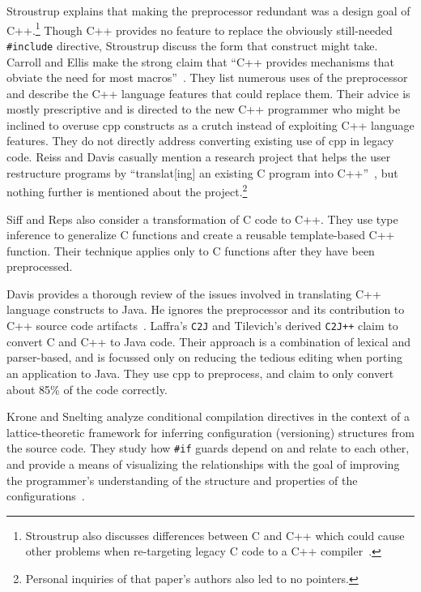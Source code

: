 \documentclass{article}
\newcommand{\Cpp}{\mbox{\textsf{cpp}}}
\newcommand{\CPP}{\mbox{\textsf{C++}}}
\newcommand{\C}{\mbox{\textsf{C}}}
\newcommand{\ppd}[1]{\texttt{\##1}}
\begin{document}
Stroustrup explains that making the preprocessor redundant was a design
goal of \CPP{}.\footnote{Stroustrup also discusses differences between
  \C{} and \CPP{} which could cause other problems when re-targeting
  legacy \C{} code to a \CPP{}
  compiler~\cite[p.~816-820]{Stroustrup97}.} Though \CPP{} provides no
feature to replace the obviously still-needed \ppd{include} directive,
Stroustrup discuss the form that construct
might take.   Carroll and Ellis make the strong claim that ``C++ provides
mechanisms that obviate the need for most
macros''~\cite[p.~147]{Carroll95}.  They list numerous uses of the
preprocessor and describe the \CPP{} language features that could
replace them.  Their advice is mostly prescriptive and is directed to
the new \CPP{} programmer who might be inclined to overuse \Cpp{}
constructs as a crutch instead of exploiting \CPP{} language features.
They do not directly address converting existing use of \Cpp{} in legacy
code.  Reiss and Davis casually mention a research project that helps
the user restructure programs by ``translat[ing] an existing \C{}
program into \CPP{}''~\cite[p.~2]{Reiss90}, but nothing further is
mentioned about the project.\footnote{Personal inquiries of that paper's
  authors also led to no pointers.}

Siff and Reps also consider a transformation of \C{} code to \CPP{}.
They use type inference to generalize \C{} functions and create a
reusable template-based \CPP{} function.  Their technique applies only
to  \C{} functions after they have been preprocessed.

Davis provides a thorough review of the issues involved in translating
\CPP{} language constructs to Java.  He ignores the preprocessor and its
contribution to \CPP{} source code artifacts~\cite{Davis97}.  Laffra's
\texttt{C2J} and Tilevich's derived \texttt{C2J++} claim to convert \C{} and
\CPP{} to Java code.  Their approach is a combination of lexical and
parser-based, and is focussed only on reducing the tedious editing when
porting an application to Java.  They use \Cpp{} to preprocess, and
claim to only convert about 85\% of the code correctly.

Krone and Snelting analyze conditional compilation directives in the
context of a lattice-theoretic framework for inferring configuration
(versioning) structures from the source code.  They study how \ppd{if}
guards depend on and relate to each other, and provide a means of
visualizing the relationships with the goal of improving the
programmer's understanding of the structure and properties of the
configurations~\cite{Krone94}.
\end{document}
